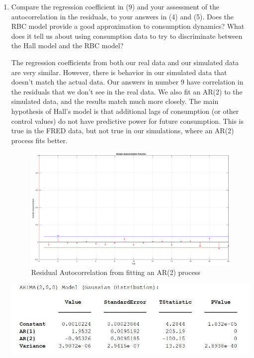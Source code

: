 \documentclass[11pt]{article}
\begin{document}
\begin{enumerate}
\newpage
\item Compare the regression coefficient in (9) and your assessment of the
autocorrelation in the residuals, to your answers in (4) and (5). Does the RBC
model provide a good approximation to consumption dynamics? What does it
tell us about using consumption data to try to discriminate between the Hall model and the RBC model?

The regression coefficients from both our real data and our simulated data are very similar. However, there is behavior in our simulated data that doesn't match the actual data. Our answers in number 9 have correlation in the residuals that we don't see in the real data. We also fit an AR(2) to the simulated data, and the results match much more closely. The main hypothesis of Hall's model is that additional lags of consumption (or other control values) do not have predictive power for future consumption. This is true in the FRED data, but not true in our simulations, where an AR(2) process fits better.

\begin{figure}[htp]
\begin{center}
\includegraphics[width=\textwidth, keepaspectratio=true]{Q9_ResidualAutocorrelationPlot_AR2.eps}
\caption{Residual Autocorrelation from fitting an AR(2) process}
\end{center}
\end{figure}

\begin{center}
\includegraphics[scale=0.75]{MacroHW2_Q9_AR2.JPG}
\end{center}
\end{enumerate}
\end{document}
